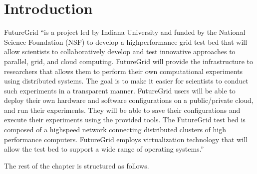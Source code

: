 
\section{Introduction}

FutureGrid \cite{las2010gce,las12fg-bookchapter} ``is a project led by Indiana University and funded by the National Science Foundation (NSF) to develop a highperformance grid test bed that will allow scientists to collaboratively develop and test innovative approaches to parallel, grid, and cloud computing. FutureGrid will provide the infrastructure to researchers that allows them to perform their own computational experiments using distributed systems. The goal is to make it easier for scientists to conduct such experiments in a transparent manner.  FutureGrid users will be able to deploy their own hardware and software configurations on a public/private cloud, and run their experiments. They will be able to save their configurations and execute their experiments using the provided tools. The FutureGrid test bed is composed of a highspeed network connecting distributed clusters of high performance computers. FutureGrid employs virtualization technology that will allow the test bed to support a wide range of operating systems.''

The rest of the chapter is structured as follows. 

